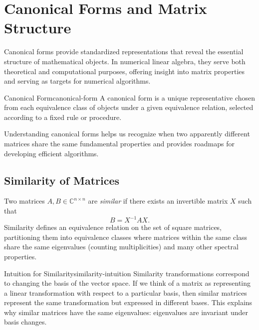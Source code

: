 \section{Canonical Forms and Matrix Structure}

Canonical forms provide standardized representations that reveal the essential structure of mathematical objects. In numerical linear algebra, they serve both theoretical and computational purposes, offering insight into matrix properties and serving as targets for numerical algorithms.

\begin{definition}{Canonical Form}{canonical-form}
    A canonical form is a unique representative chosen from each equivalence class of objects under a given equivalence relation, selected according to a fixed rule or procedure.
\end{definition}

Understanding canonical forms helps us recognize when two apparently different matrices share the same fundamental properties and provides roadmaps for developing efficient algorithms.

\subsection{Similarity of Matrices}

Two matrices $A, B \in \mathbb{C}^{n \times n}$ are \emph{similar} if there exists an invertible matrix $X$ such that
\[
    B = X^{-1} A X.
\]
Similarity defines an equivalence relation on the set of square matrices, partitioning them into equivalence classes where matrices within the same class share the same eigenvalues (counting multiplicities) and many other spectral properties.

\begin{remark}{Intuition for Similarity}{similarity-intuition}
    Similarity transformations correspond to changing the basis of the vector space. If we think of a matrix as representing a linear transformation with respect to a particular basis, then similar matrices represent the same transformation but expressed in different bases. This explains why similar matrices have the same eigenvalues: eigenvalues are invariant under basis changes.
\end{remark}

